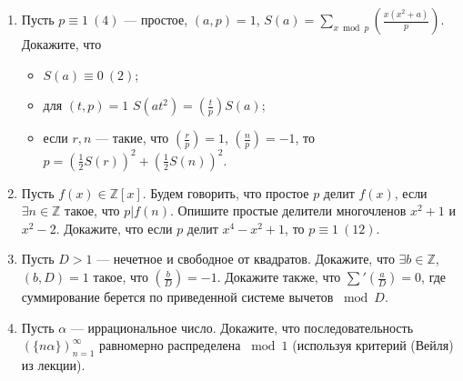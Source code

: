 \documentclass[a4paper, 11pt]{article}
\begin{document}
\begin{enumerate}[topsep=0pt]
    \item Пусть $p \equiv 1\ (4)$ --- простое, $(a,p)=1$, $S(a) = \sum_{x \bmod p} \left(\frac{x(x^2+a)}{p}\right)$. Докажите, что 
    \begin{itemize}[noitemsep,topsep=0pt]
        \item $S(a)\equiv 0\ (2)$;
        \item для $(t,p)=1$ $S(at^2)= \left(\frac{t}{p}\right) S(a)$;
        \item если $r, n$ --- такие, что $\left(\frac{r}{p}\right)=1$, $\left(\frac{n}{p}\right)=-1$, то $p=\left(\frac{1}{2}S(r)\right)^2+\left(\frac{1}{2}S(n)\right)^2$.
    \end{itemize}

    \item Пусть $f(x) \in \mathbb{Z}[x]$. Будем говорить, что простое $p$ делит $f(x)$, если $\exists n \in \mathbb{Z}$ такое, что $p|f(n)$. Опишите простые делители многочленов $x^2+1$ и $x^2-2$. Докажите, что если $p$ делит $x^4-x^2+1$, то $p \equiv 1\ (12)$. %
    \item Пусть $D>1$ --- нечетное и свободное от квадратов. Докажите, что $\exists b\in \mathbb{Z}$, $(b,D)=1$ такое, что $\left(\frac{b}{D}\right)=-1$. Докажите также, что $\sum' \left(\frac{a}{D}\right) = 0$, где суммирование берется по приведенной системе вычетов $\bmod D$. %
    \item Пусть $\alpha$ --- иррациональное число. Докажите, что последовательность $(\{n\alpha\})_{n=1}^\infty$ равномерно распределена $\bmod 1$ (используя критерий (Вейля) из лекции).
\end{enumerate}

\end{document}
